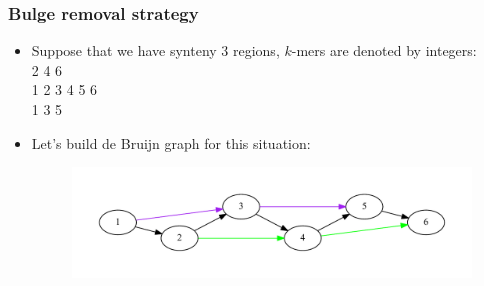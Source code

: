 \documentclass[svgnames,14pt]{beamer}
\begin{document}
\begin{frame}
\frametitle{Bulge removal strategy}
\begin{itemize}
\item Suppose that we have synteny 3 regions, \(k\)-mers are denoted by integers: \\
2 4 6 \\
1 2 3 4 5 6 \\
1 3 5 \\
\item Let's build de Bruijn graph for this situation:
\begin{changemargin}{-1.cm}{-1.cm}
\begin{figure}
\centering
\includegraphics[scale = 0.50]{graph1.pdf}
\end{figure}
\end{changemargin}
\end{itemize}
\end{frame}
\end{document}
